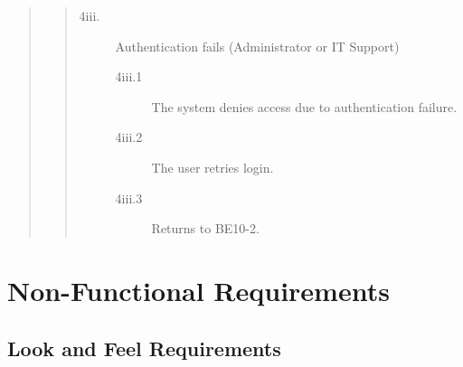 \documentclass[]{article}
\begin{document}
\begin{enumerate}[{\bf BE10.}]
\begin{quote}
\begin{quote}
\begin{description}
                    \item[\textmd{4iii.}] Authentication fails (Administrator or IT Support)
                    \begin{description}
                        \item[\textmd{4iii.1}] The system denies access due to authentication failure.
                        \item[\textmd{4iii.2}] The user retries login.
                        \item[\textmd{4iii.3}] Returns to BE10-2.
                    \end{description}
                \end{description}
            \end{quote}
        \end{quote}
\end{enumerate}



\section{Non-Functional Requirements}
\label{sec:none-functional_requirements}

\subsection{Look and Feel Requirements}
\label{sub:look_and_feel_requirements}
\end{document}
